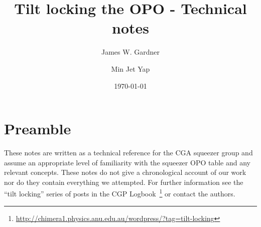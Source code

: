 \documentclass[aps,pra,superscriptaddress,reprint,nofootinbib]{revtex4-1}
\begin{document}
\title{Tilt locking the OPO - Technical notes}

\author{James W. Gardner}

\author{Min Jet Yap}



\date{\today}



\maketitle

\section{Preamble}
\label{sec:preamble}

These notes are written as a technical reference for the CGA squeezer group and assume an appropriate level of familiarity with the squeezer OPO table and any relevant concepts.
These notes do not give a chronological account of our work nor do they contain everything we attempted. For further information see the ``tilt locking'' series of posts in the CGP Logbook~\footnote{\url{http://chimera1.physics.anu.edu.au/wordpress/?tag=tilt-locking}} or contact the authors.
\end{document}
